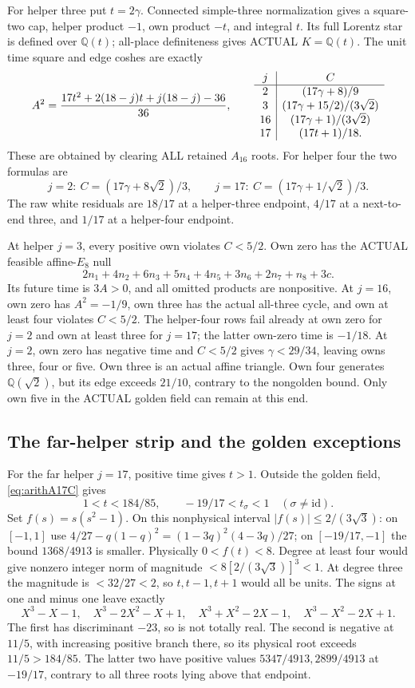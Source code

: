 \documentclass[11pt]{article}
\begin{document}
For helper three put \(t=2\gamma\).
Connected simple-three normalization gives a square-two cap,
helper product \(-1\), own product \(-t\), and integral \(t\).
Its full Lorentz star is defined over \(\mathbb Q(t)\);
all-place definiteness gives ACTUAL \(K=\mathbb Q(t)\).
The unit time square and edge coshes are exactly
\[
 A^2={17t^2+2(18-j)t+j(18-j)-36\over36},
\qquad
\begin{array}{c|c}
j&C\\ \hline
2&(17\gamma+8)/9\\
3&(17\gamma+15/2)/(3\sqrt2)\\
16&(17\gamma+1)/(3\sqrt2)\\
17&(17t+1)/18 .
\end{array}
\]
These are obtained by clearing ALL retained \(A_{16}\) roots.
For helper four the two formulas are
\[
 j=2:\ C=(17\gamma+8\sqrt2)/3,\qquad
 j=17:\ C=(17\gamma+1/\sqrt2)/3 .
\]
The raw white residuals are \(18/17\) at a helper-three
endpoint, \(4/17\) at a next-to-end three, and \(1/17\)
at a helper-four endpoint.

At helper \(j=3\), every positive own violates \(C<5/2\).
Own zero has the ACTUAL feasible affine-\(E_8\) null
\[
 2n_1+4n_2+6n_3+5n_4+4n_5+3n_6+2n_7+n_8+3c .
\]
Its future time is \(3A>0\), and all omitted products are
nonpositive.
At \(j=16\), own zero has \(A^2=-1/9\), own three has
the actual all-three cycle, and own at least four violates
\(C<5/2\).
The helper-four rows fail already at own zero for \(j=2\)
and own at least three for \(j=17\); the latter own-zero
time is \(-1/18\).
At \(j=2\), own zero has negative time and
\(C<5/2\) gives \(\gamma<29/34\), leaving owns three,
four or five.
Own three is an actual affine triangle.
Own four generates \(\mathbb Q(\sqrt2)\), but its edge exceeds
\(21/10\), contrary to the nongolden bound.
Only own five in the ACTUAL golden field can remain at this end.

\subsection{The far-helper strip and the golden exceptions}
\label{app:arithA17goldenends}

For the far helper \(j=17\), positive time gives \(t>1\).
Outside the golden field, \eqref{eq:arithA17C} gives
\[
 1<t<184/85,\qquad -19/17<t_\sigma<1\quad(\sigma\ne\mathrm{id}).
\]
Set \(f(s)=s(s^2-1)\).
On this nonphysical interval
\(\lvert f(s)\rvert\le2/(3\sqrt3)\):
on \([-1,1]\) use
\(4/27-q(1-q)^2=(1-3q)^2(4-3q)/27\);
on \([-19/17,-1]\) the bound \(1368/4913\) is smaller.
Physically \(0<f(t)<8\).
Degree at least four would give nonzero integer norm of
magnitude \(<8[2/(3\sqrt3)]^3<1\).
At degree three the magnitude is \(<32/27<2\), so
\(t,t-1,t+1\) would all be units.
The signs at one and minus one leave exactly
\[
 X^3-X-1,\quad X^3-2X^2-X+1,\quad
 X^3+X^2-2X-1,\quad X^3-X^2-2X+1 .
\]
The first has discriminant \(-23\), so is not totally real.
The second is negative at \(11/5\), with increasing positive
branch there, so its physical root exceeds \(11/5>184/85\).
The latter two have positive values \(5347/4913,2899/4913\)
at \(-19/17\), contrary to all three roots lying above that
endpoint.
\end{document}

